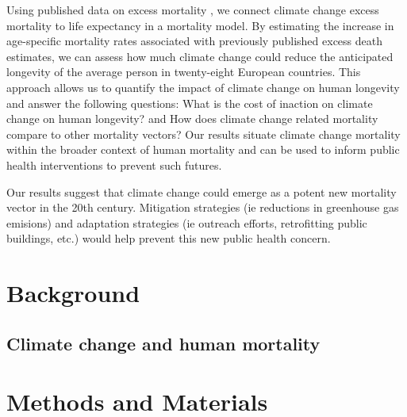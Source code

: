 \documentclass[12pt,]{article}
\begin{document}
Using published data on excess mortality \citep{forzieri2017increasing},
we connect climate change excess mortality to life expectancy in a
mortality model. By estimating the increase in age-specific mortality
rates associated with previously published excess death estimates, we
can assess how much climate change could reduce the anticipated
longevity of the average person in twenty-eight European countries. This
approach allows us to quantify the impact of climate change on human
longevity and answer the following questions: What is the cost of
inaction on climate change on human longevity? and How does climate
change related mortality compare to other mortality vectors? Our results
situate climate change mortality within the broader context of human
mortality and can be used to inform public health interventions to
prevent such futures.

Our results suggest that climate change could emerge as a potent new
mortality vector in the 20th century. Mitigation strategies (ie
reductions in greenhouse gas emisions) and adaptation strategies (ie
outreach efforts, retrofitting public buildings, etc.) would help
prevent this new public health concern.

\hypertarget{background}{%
\section{Background}\label{background}}

\hypertarget{climate-change-and-human-mortality}{%
\subsection{Climate change and human
mortality}\label{climate-change-and-human-mortality}}

\hypertarget{methods-and-materials}{%
\section{Methods and Materials}\label{methods-and-materials}}
\end{document}
